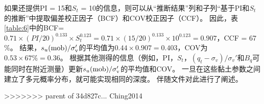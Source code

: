 \begin{Parallel}{0.60\textwidth}{}
{    }
    \ParallelRText
    {
        如果还提供PI = 15和$S_t$ = 10的信息，则可以从“推断结果”列和子列“基于PI和$S_t$的推断”中提取偏差校正因子（BCF）和COV校正因子（CCF）。 因此，表\ref{table:6}中的BCF=$0.71\times{}(PI/20)^{0.133}\times{}S_t^{0.123} = 0.71\times{}(15/20)^{0.133}\times{}10^{0.123} = 0.907$，CCF = 67$\%$。 结果，$s_u(\rm{mob})/\sigma_v'$的平均值为$0.44\times{}0.907 = 0.403$，COV为$0.53\times{}67\%= 0.36$。 根据其他测得的信息（例如，PI，$S_t$，$(q_t-\sigma_v)/\sigma_v'$和$B_q$可能同时在附近测量）更新$s_u(\rm{mob})/\sigma_v'$的平均值和COV。 一旦在这些黏土参数之间建立了多元概率分布，就可能实现相同的深度。 伴随文件对此进行了阐述\citep{Ching2014686}。
    }
\end{Parallel}
>>>>>>> parent of 34d827c... Ching2014
